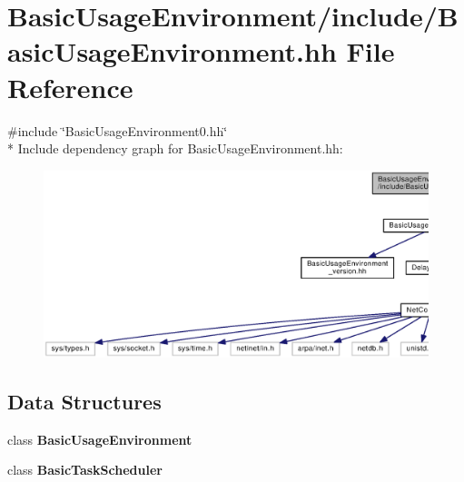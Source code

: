 \section{Basic\+Usage\+Environment/include/\+Basic\+Usage\+Environment.hh File Reference}
\label{BasicUsageEnvironment_8hh}
{\ttfamily \#include \char`\"{}Basic\+Usage\+Environment0.\+hh\char`\"{}}\\*
Include dependency graph for Basic\+Usage\+Environment.\+hh\+:
\nopagebreak
\begin{figure}[H]
\begin{center}
\leavevmode
\includegraphics[width=350pt]{BasicUsageEnvironment_8hh__incl}
\end{center}
\end{figure}
\subsection*{Data Structures}
\begin{DoxyCompactItemize}
\item 
class {\bf Basic\+Usage\+Environment}
\item 
class {\bf Basic\+Task\+Scheduler}
\end{DoxyCompactItemize}
